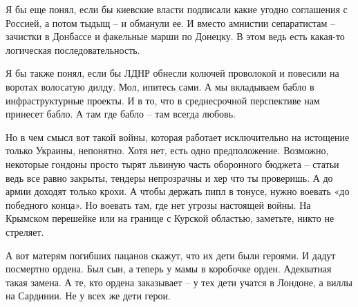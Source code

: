 Я бы еще понял, если бы киевские власти подписали какие угодно соглашения с
Россией, а потом тыдыщ – и обманули ее. И вместо амнистии сепаратистам –
зачистки в Донбассе и факельные марши по Донецку. В этом ведь есть какая-то
логическая последовательность.

Я бы также понял, если бы ЛДНР обнесли колючей проволокой и повесили на воротах
волосатую дилду. Мол, ипитесь сами. А мы вкладываем бабло в инфраструктурные
проекты. И в то, что в среднесрочной перспективе нам принесет бабло. А там где
бабло – там всегда любовь.

Но в чем смысл вот такой войны, которая работает исключительно на истощение
только Украины, непонятно. Хотя нет, есть одно предположение. Возможно,
некоторые гондоны просто тырят львиную часть оборонного бюджета – статьи ведь
все равно закрыты, тендеры непрозрачны и хер что ты проверишь. А до армии
доходят только крохи. А чтобы держать пипл в тонусе, нужно воевать «до
победного конца». Но воевать там, где нет угрозы настоящей войны. На Крымском
перешейке или на границе с Курской областью, заметьте, никто не стреляет.

А вот матерям погибших пацанов скажут, что их дети были героями. И дадут
посмертно ордена. Был сын, а теперь у мамы в коробочке орден. Адекватная такая
замена. А те, кто ордена заказывает – у тех дети учатся в Лондоне, а виллы на
Сардинии. Не у всех же дети герои.

